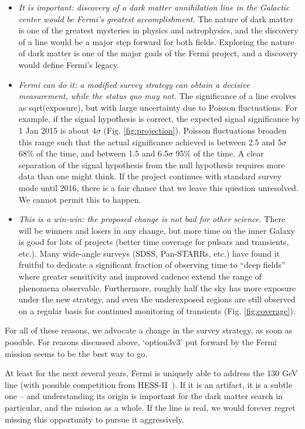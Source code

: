 \documentclass[aps,prd,superscriptaddress,nofootinbib,fixlfloat, 12pt]{revtex4-1}
\begin{document}
\begin{itemize}

\item{\it It is important: discovery of a dark matter annihilation line in the
    Galactic center would be Fermi's greatest accomplishment.}  The nature of
  dark matter is one of the greatest mysteries in physics and astrophysics,
  and the discovery of a line would be a major step forward for both fields.
  Exploring the nature of dark matter is one of the major goals of the Fermi
  project, and a discovery would define Fermi's legacy.

\item{\it Fermi can do it: a modified survey strategy can obtain a decisive
    measurement, while the status quo may not.}  The significance of a line
  evolves as sqrt(exposure), but with large uncertainty due to Poisson
  fluctuations.  For example, if the signal hypothesis is correct, the
  expected signal significance by 1 Jan 2015 is about $4\sigma$
  (Fig. \ref{fig:projection}).  Poisson fluctuations broaden this range such
  that the actual significance achieved is between 2.5 and
  5$\sigma$ 68\% of the time, and between 1.5 and 6.5$\sigma$ 95\% of the
  time.  A clear separation of the signal hypothesis from the null hypothesis
  requires more data than one might think.  If the project continues with
  standard survey mode until 2016, there is a fair chance that we leave this
  question unresolved.  We cannot permit this to happen.

\item{\it This is a win-win: the proposed change is not bad for other science.}  There will be winners and
  losers in any change, but more time on the inner Galaxy is good for lots of
  projects (better time coverage for pulsars and transients, etc.).  Many
  wide-angle surveys (SDSS, Pan-STARRs, etc.) have found it fruitful to
  dedicate a significant fraction of observing time to ``deep fields'' where
  greater sensitivity and improved cadence extend the range of phenomena
  observable.  Furthermore, roughly half
  the sky has more exposure under the new strategy, and even the underexposed
  regions are still observed on a regular basis for continued monitoring of
  transients (Fig. \ref{fig:coverage}).

\end{itemize}

For all of these reasons, we advocate a change in the survey strategy, as soon
as possible. For reasons discussed above, `option3v3' put forward by the Fermi
mission seems to be the best way to go.

At least for the next several years, Fermi is uniquely able to address the 130
GeV line (with possible competition from HESS-II~\cite{Bergstrom:2012vd}).
If it is an artifact, it is a subtle one -- and understanding its
origin is important for the dark matter search in
particular, and the mission as a whole. If the line is real, we would forever
regret missing this opportunity to pursue it aggressively. 

\clearpage

\end{document}
